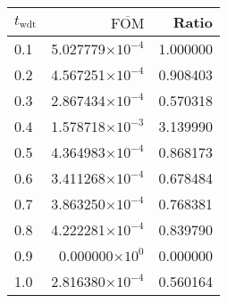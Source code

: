 \begin{tabular}{lrr}
\toprule
$t_{\mathrm{wdt}}$ & $\overline{\mathrm{FOM}}$ &    Ratio \\
\midrule
               0.1 &  5.027779$\times 10^{-4}$ & 1.000000 \\
               0.2 &  4.567251$\times 10^{-4}$ & 0.908403 \\
               0.3 &  2.867434$\times 10^{-4}$ & 0.570318 \\
               0.4 &  1.578718$\times 10^{-3}$ & 3.139990 \\
               0.5 &  4.364983$\times 10^{-4}$ & 0.868173 \\
               0.6 &  3.411268$\times 10^{-4}$ & 0.678484 \\
               0.7 &  3.863250$\times 10^{-4}$ & 0.768381 \\
               0.8 &  4.222281$\times 10^{-4}$ & 0.839790 \\
               0.9 &   0.000000$\times 10^{0}$ & 0.000000 \\
               1.0 &  2.816380$\times 10^{-4}$ & 0.560164 \\
\bottomrule
\end{tabular}
